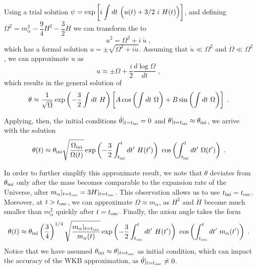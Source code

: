 \documentclass[11pt,a4paper]{article}
\begin{document}
Using a trial solution $\psi = \exp\left[  i \displaystyle \int d t \ \Big( u(t) +3/2 \ i \ H(t) \Big)  \right]$, and defining $\Omega^2 = m_{\alpha}^2 - \dfrac{9}{4} H^2 -  \dfrac{3}{2} \dot H $ we can transform the  to 
%
\begin{equation}
	u^2 = \Omega^2 + i \ \dot u \; ,
	\label{eq:eom_of_u}
\end{equation}
%
which has a formal solution $u = \pm \sqrt{\Omega^2 + i \dot u}$. Assuming that $\dot u \ll \Omega^2$ and $\dot \Omega \ll \Omega^2$, we can approximate $u$ as
%
\begin{equation}
	u \approx \pm \Omega + \dfrac{i}{2} \dfrac{d \log \Omega}{d t} \;,
	\label{eq:u_approx}
\end{equation}
%
which results in the general solution of  
%
\begin{equation}
	\theta \approx \dfrac{1}{\sqrt{\Omega}} \exp\left( -\dfrac{3}{2} \int d t \ H \right) \left[  A \cos\left(  \int d t \ \Omega \right) +  B \sin\left(  \int d t \ \Omega \right)     \right] \;. 
	\label{eq:general_solution_eom_approx}
\end{equation}

Applying, then, the initial conditions $ \dot \theta |_{t=t_{\rm ini}{}} = 0$ and  $\theta|_{t=t_{\rm ini}{}} \approx \theta_{\rm ini}{}$, we arrive with the solution 
%
\begin{equation}
	\theta(t) \approx \theta_{\rm ini}{} \sqrt{ \dfrac{ \Omega_{\rm ini} }{\Omega (t)} } \exp\left( -\dfrac{3}{2} \int_{t_{\rm ini}{}}^t d t^\prime  \ H(t^\prime) \right) \  \cos\left(  \int_{t_{\rm ini}{}}^t d t^\prime  \ \Omega(t^\prime) \right)   \;.
	\label{eq:solution_eom_approx} 
\end{equation}


In order to further simplify this approximate result, we note that $\theta$ deviates from $\theta_{\rm ini}{}$ only after the mass becomes comparable to the expansion rate of the Universe, \ie after $m_{\alpha}|_{t = t_{\rm osc}{}} = 3 H|_{t = t_{\rm osc}{}}$. This observation allows us to use $t_{\rm ini}{} = t_{\rm osc}{}$.  Moreover, at $t> t_{\rm osc}{}$, we can approximate $\Omega \approx m_{\alpha}$, as $H^2$ and $\dot H$ become much smaller than $m_\alpha^2$ quickly after $t=t_{\rm osc}{}$. Finally, the axion angle takes the form
%
\begin{equation}
	\theta(t) \approx \thetai \lrb{\dfrac{3}{4}}^{1/4} \sqrt{ \dfrac{ \ma|_{t=\tosc} }{\ma  (t)} } \exp\lrb{-\dfrac{3}{2} \int_{\tosc}^t d t^\prime  \ H(t^\prime)} \  \cos\lrb{ \int_{\tosc}^t d t^\prime  \ \ma(t^\prime)}   \;.
	\label{eq:solution_eom_approx_final} 
\end{equation}
%
Notice that we have assumed $\theta_{\rm ini}{} \approx \theta|_{t=t_{\rm osc}{}}$ as initial condition, which can impact the accuracy of the WKB approximation, as $\dot \theta|_{t=t_{\rm osc}{}} \neq 0$.
\end{document}
